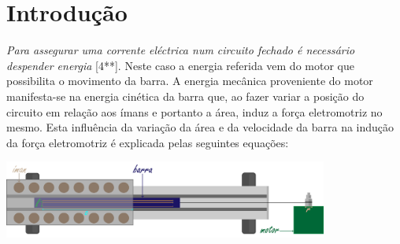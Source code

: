 \documentclass[11pt]{report}
\begin{document}
\chapter{Introdução}
\textit{Para assegurar uma corrente eléctrica num circuito fechado é necessário despender energia} [4**]. Neste caso a energia referida vem do motor que possibilita o movimento da barra. A energia mecânica proveniente do motor manifesta-se na energia cinética da barra que, ao fazer variar a posição do circuito em relação aos ímans e portanto a área, induz a força eletromotriz no mesmo. Esta influência da variação da área e da velocidade da barra na indução da força eletromotriz é explicada pelas seguintes equações:

\begin{center}
    \includegraphics[width=0.8\textwidth]{FIGBARRA.png}
    \label{fig:mc-1}
\end{center}
\end{document}
